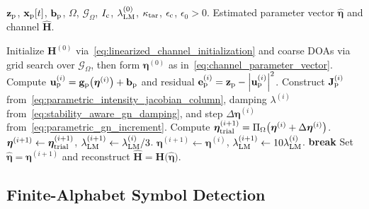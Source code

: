 \documentclass[journal]{IEEEtran}
\begin{document}
\begin{algorithm}[t]
\caption{Joint DOA and Channel-Gain Estimation}
\label{alg:joint_gn_estimation}
\begin{algorithmic}[1]
\REQUIRE $\mathbf{z}_{\rm p}$, $\mathbf{x}_{\rm p}[t]$, $\mathbf{b}_{\rm p}$, $\Omega$, $\mathcal{G}_{\Omega}$, $I_{\rm c}$, $\lambda_{\rm LM}^{(0)}$, $\kappa_{\rm tar}$, $\epsilon_{\rm c}$, $\epsilon_0 > 0$.
\ENSURE Estimated parameter vector $\widehat{\boldsymbol{\eta}}$ and channel $\widehat{\mathbf{H}}$.

\STATE Initialize $\mathbf{H}^{(0)}$ via~\eqref{eq:linearized_channel_initialization} and coarse DOAs via grid search over $\mathcal{G}_{\Omega}$, then form $\boldsymbol{\eta}^{(0)}$ as in~\eqref{eq:channel_parameter_vector}.
\STATE Compute $\mathbf{u}_{\rm p}^{(i)} = \mathbf{g}_{\rm p}\bigl(\boldsymbol{\eta}^{(i)}\bigr) + \mathbf{b}_{\rm p}$ and residual $\mathbf{e}_{\rm p}^{(i)} = \mathbf{z}_{\rm p} - \left|\mathbf{u}_{\rm p}^{(i)}\right|^{2}$.
\STATE Construct $\mathbf{J}_{\rm p}^{(i)}$ from~\eqref{eq:parametric_intensity_jacobian_column}, damping $\lambda^{(i)}$ from~\eqref{eq:stability_aware_gn_damping}, and step $\Delta\boldsymbol{\eta}^{(i)}$ from~\eqref{eq:parametric_gn_increment}.
\STATE Compute $\boldsymbol{\eta}_{\rm trial}^{(i+1)} = \Pi_\Omega\bigl(\boldsymbol{\eta}^{(i)} + \Delta\boldsymbol{\eta}^{(i)}\bigr)$.
\STATE $\boldsymbol{\eta}^{(i+1)} \leftarrow \boldsymbol{\eta}_{\rm trial}^{(i+1)}$, \quad $\lambda_{\rm LM}^{(i+1)} \leftarrow \lambda_{\rm LM}^{(i)}/3$.
\ELSE
\STATE $\boldsymbol{\eta}^{(i+1)} \leftarrow \boldsymbol{\eta}^{(i)}$, \quad $\lambda_{\rm LM}^{(i+1)} \leftarrow 10\lambda_{\rm LM}^{(i)}$.
\ENDIF
{}
\STATE \textbf{break}
\ENDIF
\ENDFOR
\STATE Set $\widehat{\boldsymbol{\eta}} = \boldsymbol{\eta}^{(i+1)}$ and reconstruct $\widehat{\mathbf{H}} = \mathbf{H}\bigl(\widehat{\boldsymbol{\eta}}\bigr)$.
\end{algorithmic}
\end{algorithm}


\subsection{Finite-Alphabet Symbol Detection}
\label{subsec:symbol_detection}
\end{document}
